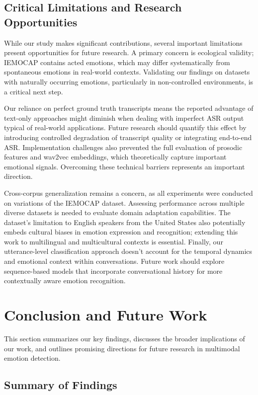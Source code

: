 \documentclass[12pt]{article}
\begin{document}
\subsection{Critical Limitations and Research Opportunities}
While our study makes significant contributions, several important limitations present opportunities for future research. A primary concern is ecological validity; IEMOCAP contains acted emotions, which may differ systematically from spontaneous emotions in real-world contexts. Validating our findings on datasets with naturally occurring emotions, particularly in non-controlled environments, is a critical next step.

Our reliance on perfect ground truth transcripts means the reported advantage of text-only approaches might diminish when dealing with imperfect ASR output typical of real-world applications. Future research should quantify this effect by introducing controlled degradation of transcript quality or integrating end-to-end ASR. Implementation challenges also prevented the full evaluation of prosodic features and wav2vec embeddings, which theoretically capture important emotional signals. Overcoming these technical barriers represents an important direction.

Cross-corpus generalization remains a concern, as all experiments were conducted on variations of the IEMOCAP dataset. Assessing performance across multiple diverse datasets is needed to evaluate domain adaptation capabilities. The dataset's limitation to English speakers from the United States also potentially embeds cultural biases in emotion expression and recognition; extending this work to multilingual and multicultural contexts is essential. Finally, our utterance-level classification approach doesn't account for the temporal dynamics and emotional context within conversations. Future work should explore sequence-based models that incorporate conversational history for more contextually aware emotion recognition.

\section{Conclusion and Future Work}
\label{sec:conclusion}

This section summarizes our key findings, discusses the broader implications of our work, and outlines promising directions for future research in multimodal emotion detection.

\subsection{Summary of Findings}
\end{document}
